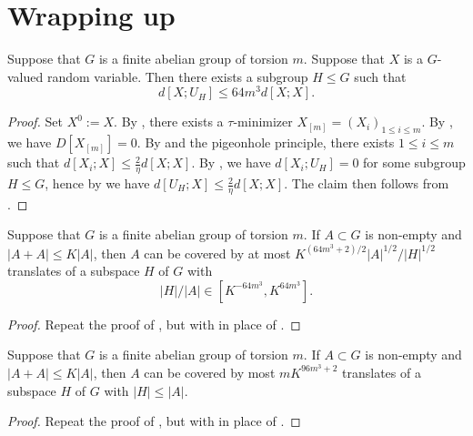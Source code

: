 \section{Wrapping up}

\begin{theorem}\label{main-entropy}\leanok Suppose that $G$ is a finite abelian group of torsion $m$.  Suppose that $X$ is a $G$-valued random variable. Then there exists a subgroup $H \leq G$ such that \[ d[X;U_H] \leq 64 m^3 d[X;X].\]
\end{theorem}

\begin{proof}  Set $X^0 := X$. By , there exists a $\tau$-minimizer $X_{[m]} = (X_i)_{1 \leq i \leq m}$.  By , we have $D[X_{[m]}]=0$. By  and the pigeonhole principle, there exists $1 \leq i \leq m$ such that $d[X_i; X] \leq \frac{2}{\eta} d[X;X]$.  By , we have $d[X_i;U_H]=0$ for some subgroup $H \leq G$, hence by  we have $d[U_H; X] \leq \frac{2}{\eta} d[X;X]$. The claim then follows from .
\end{proof}

\begin{lemma}\label{pfr_aux_torsion}\leanok  Suppose that $G$ is a finite abelian group of torsion $m$.  If $A \subset G$ is non-empty and
  $|A+A| \leq K|A|$, then $A$ can be covered by at most $K ^
  {(64m^3+2)/2}|A|^{1/2}/|H|^{1/2}$ translates of a subspace $H$ of $G$ with
  \begin{equation}
    \label{ah2}
    |H|/|A| \in [K^{-64m^3}, K^{64m^3}].
  \end{equation}
  \end{lemma}

\begin{proof}  Repeat the proof of , but with  in place of .
\end{proof}

\begin{theorem}[PFR]\label{pfr-torsion}\leanok  Suppose that $G$ is a finite abelian group of torsion $m$.
  If $A \subset G$ is non-empty and $|A+A| \leq K|A|$, then $A$ can be covered by most $mK^{96m^3+2}$ translates of a subspace $H$ of $G$ with $|H| \leq |A|$.
  \end{theorem}

  \begin{proof}\leanok Repeat the proof of , but with  in place of .
  \end{proof}
